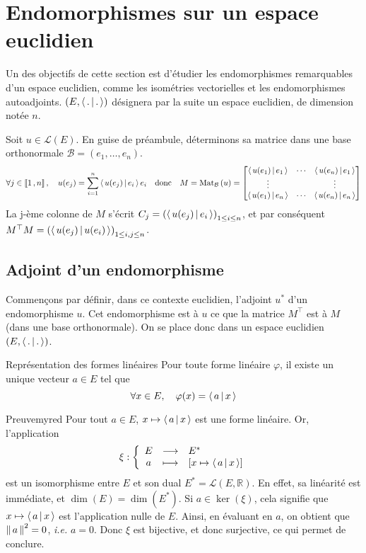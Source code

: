 \newpage

\section[Endom. sur un espace euclidien]{Endomorphismes sur un espace euclidien}

Un des objectifs de cette section est d’étudier les endomorphismes remarquables d’un espace euclidien, comme les isométries vectorielles et les endomorphismes autoadjoints. $\left(E, \left<\,.\,\middle|\,.\,\right>\right)$ désignera par la suite un espace euclidien, de dimension notée $n$.

Soit $u \in \mathcal{L}(E)$. En guise de préambule, déterminons sa matrice dans une base orthonormale $\mathcal{B} = (e_1,\ldots,e_n)$. 
\[ \forall j \in \left\llbracket 1 \, , n \right\rrbracket, \quad u(e_j) = \sum_{i=1}^{n} \left<\,u(e_j)\,\middle|\,e_i\,\right> e_i \quad \text{donc} \quad M = \text{Mat}_{\mathcal{B}}\left(u\right) = \begin{bmatrix}
    \left<\,u(e_1)\,\middle|\,e_1\,\right> & \cdots & \left<\,u(e_n)\,\middle|\,e_1\,\right> \\
    \vdots & & \vdots \\
    \left<\,u(e_1)\,\middle|\,e_n\,\right> & \cdots & \left<\,u(e_n)\,\middle|\,e_n\,\right> 
\end{bmatrix} \]    
La j-ème colonne de $M$ s’écrit $C_j = \left(\left<\,u(e_j)\,\middle|\,e_i\,\right>\right)_{1 \leq i \leq n}$, et par conséquent $M^{\top} M = \left(\left<\,u(e_j)\,\middle|\,u(e_i)\,\right>\right)_{1 \leq i,j \leq n}$.

\subsection{Adjoint d’un endomorphisme}

    Commençons par définir, dans ce contexte euclidien, l’adjoint $u^*$ d’un endomorphisme $u$. Cet endomorphisme est à $u$ ce que la matrice $M^{\top}$ est à $M$ (dans une base orthonormale). On se place donc dans un espace euclidien $\left(E,\left<\,.\,\middle|\,.\,\right>\right)$.

    \begin{theo}{Représentation des formes linéaires}{}
        Pour toute forme linéaire $\varphi$, il existe un unique vecteur $a \in E$ tel que 
        \[ \forall x \in E, \quad \varphi(x) = \left<\,a\,\middle|\,x\,\right> \]
    \end{theo}
    
    \begin{demo}{Preuve}{myred}
        Pour tout $a \in E$, $x \mapsto \left<\,a\,\middle|\,x\,\right>$ est une forme linéaire. Or, l’application 
        \[ \fonction{\xi}{E}{E^*}{a}{\left[x \mapsto \spr{a}{x}\right]} \]   
        est un isomorphisme entre $E$ et son dual $E^* = \mathcal{L}(E,\mathbb{R})$. En effet, sa linéarité est immédiate, et $\dim(E) = \dim(E^*)$. Si $a \in \ker(\xi)$, cela signifie que $x \mapsto \left<\,a\,\middle|\,x\,\right>$ est l’application nulle de $E$. Ainsi, en évaluant en $a$, on obtient que $\left\lVert\,a\,\right\rVert^2 = 0$, \textit{i.e.} $a = 0$. Donc $\xi$ est bijective, et donc surjective, ce qui permet de conclure.
    \end{demo}

